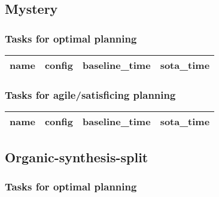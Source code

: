 \documentclass{article}
\begin{document}
                \newpage \subsection{Mystery}
                    \subsubsection*{Tasks for optimal planning}
                    
                            \begin{center}
                            \scriptsize
                            \begin{tabular}{@{}l|r|r|r@{}}
                            name & config & baseline\_time & sota\_time\\\midrule
                            
                            \end{tabular}
                            \end{center}
                    

                    \subsubsection*{Tasks for agile/satisficing planning}
                    
                            \begin{center}
                            \scriptsize
                            \begin{tabular}{@{}l|r|r|r@{}}
                            name & config & baseline\_time & sota\_time\\\midrule
                            
                            \end{tabular}
                            \end{center}
                    
                \newpage \subsection{Organic-synthesis-split}
                    \subsubsection*{Tasks for optimal planning}
                    
\end{document}
